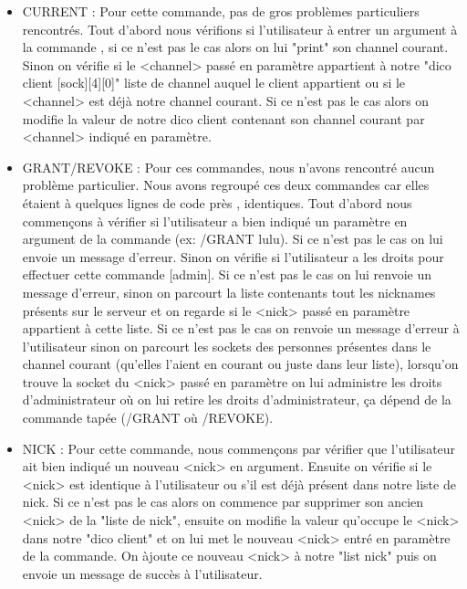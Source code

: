 \documentclass[12pt]{article}
\begin{document}
\begin{itemize}

    \item CURRENT : Pour cette commande, pas de gros problèmes particuliers rencontrés. Tout d'abord nous vérifions si l'utilisateur à entrer un argument à la commande , si ce n'est pas 
    le cas alors on lui "print" son channel courant. Sinon on vérifie si le <channel> passé en paramètre appartient à notre "dico client [sock][4][0]" liste de channel auquel le client appartient
    ou si le <channel> est déjà notre channel courant. Si ce n'est pas le cas alors on modifie la valeur de notre dico client contenant son channel courant par <channel> indiqué en paramètre.\\
    \item GRANT/REVOKE : Pour ces commandes, nous n'avons rencontré aucun problème particulier. Nous avons regroupé ces deux commandes car elles étaient à quelques lignes de code près , identiques. 
    Tout d'abord nous commençons à vérifier si l'utilisateur a bien indiqué un paramètre en argument de la commande (ex: /GRANT lulu). Si ce n'est pas le cas on lui envoie un message d'erreur.
    Sinon on vérifie si l'utilisateur a les droits pour effectuer cette commande [admin]. Si ce n'est pas le cas on lui renvoie un message d'erreur, sinon on parcourt la liste contenants 
    tout les nicknames présents sur le serveur et on regarde si le <nick> passé en paramètre appartient à cette liste. Si ce n'est pas le cas on renvoie un message d'erreur à l'utilisateur sinon
    on parcourt les sockets des personnes présentes dans le channel courant (qu'elles l'aient en courant ou juste dans leur liste), lorsqu'on trouve la socket du <nick> passé en paramètre on lui administre les droits d'administrateur où on lui retire
    les droits d'administrateur, ça dépend de la commande tapée (/GRANT où /REVOKE).\\
    \item NICK : Pour cette commande, nous commençons par vérifier que l'utilisateur ait bien indiqué un nouveau <nick> en argument. Ensuite on vérifie si le <nick> est identique à l'utilisateur ou 
    s'il est déjà présent dans notre liste de nick. Si ce n'est pas le cas alors on commence par supprimer son ancien <nick> de la "liste de nick", ensuite on modifie la valeur qu'occupe le <nick>
    dans notre "dico client" et on lui met le nouveau <nick> entré en paramètre de la commande. On àjoute ce nouveau <nick> à notre "list nick" puis on envoie un message de succès à l'utilisateur.\\

\end{itemize}
\end{document}
